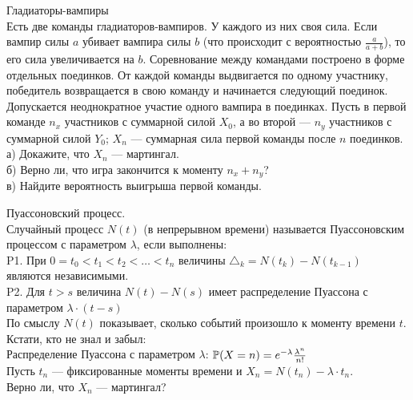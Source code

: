 \begin{problem}
 Гладиаторы-вампиры \\
Есть две команды гладиаторов-вампиров. У каждого из них своя сила.
Если вампир силы $a$ убивает вампира силы $b$ (что происходит с
вероятностью $\frac{a}{a+b}$), то его сила увеличивается на $b$.
Соревнование между командами построено в форме отдельных
поединков. От каждой команды выдвигается по одному участнику,
победитель возвращается в свою команду и начинается следующий
поединок. Допускается неоднократное участие одного вампира в
поединках. Пусть в первой команде $n_{x}$ участников с суммарной
силой $X_{0}$, а во второй — $n_{y}$ участников с суммарной силой
$Y_{0}$; $X_{n}$ — суммарная сила первой команды после $n$
поединков. \\
а) Докажите, что $X_{n}$ — мартингал. \\
б) Верно ли, что игра закончится к моменту $n_{x}+n_{y}$? \\
в) Найдите вероятность выигрыша первой команды.

\begin{sol}

\end{sol}
\end{problem}

\begin{problem}
 Пуассоновский процесс. \\
Случайный процесс $N(t)$ (в непрерывном времени) называется
Пуассоновским
процессом с параметром $\lambda$, если выполнены: \\
P1. При $0=t_{0}<t_{1}<t_{2}<\ldots<t_{n}$ величины
$\triangle_{k}=N(t_{k})-N(t_{k-1})$ являются независимыми. \\
P2. Для $t>s$ величина $N(t)-N(s)$ имеет распределение Пуассона с
параметром $\lambda \cdot (t-s)$ \\
По смыслу $N(t)$ показывает, сколько событий произошло к моменту
времени $t$. \\
Кстати, кто не знал и забыл: \\
Распределение Пуассона с параметром $\lambda$:
$\P(X=n)=e^{-\lambda}\frac{\lambda^{n}}{n!}$ \\
Пусть $t_{n}$ — фиксированные моменты времени и
$X_{n}=N(t_{n})-\lambda\cdot t_{n}$. \\
Верно ли, что $X_{n}$ — мартингал?

\begin{sol}

\end{sol}
\end{problem}

